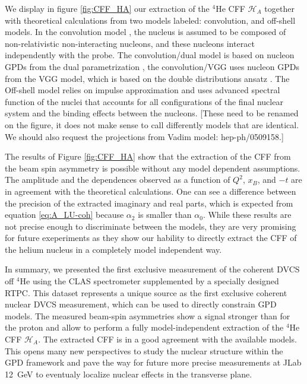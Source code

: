 \documentclass[nofootinbib,twocolumn,showpacs,prl,superscriptaddress,secnumarabic,amssymb,nobibnotes,aps,floatfix,preprint]{revtex4}
\begin{document}
We display in figure \ref{fig:CFF_HA} our extraction of the $^4$He CFF 
$\mathcal{H}_A$ together with theoretical calculations from two models 
labeled: convolution, and off-shell models. In the convolution 
model \cite{Vadim_priv}, the nucleus is assumed to be composed of 
non-relativistic non-interacting nucleons, and these nucleons interact 
independently with the probe. The convolution/dual model is based on nucleon GPDs from 
the dual parametrization \cite{Guzey:2006xi}, the convolution/VGG uses nucleon GPDs  
from the VGG model, which is based on the double distributions ansatz 
\cite{DD_model}. The Off-shell model \cite{GonzalezHernandez:2012jv} relies on 
impulse approximation and uses advanced spectral function of the 
nuclei that accounts for all configurations of the final nuclear system and the 
binding effects between the nucleons.
[These need to be renamed on the figure, it does not make sense to call differently
models that are identical. We should also request the projections from Vadim
model: hep-ph/0509158.]

The results of Figure \ref{fig:CFF_HA} show that the extraction of the CFF
from the beam spin asymmetry is possible without any model dependent 
assumptions. The amplitude and the dependences observed as a function of 
$Q^{2}$, $x_B$, and $-t$ are in agreement 
with the theoretical calculations. One can see a difference between the 
precision of the extracted imaginary and real parts, which is expected from
equation \ref{eq:A_LU-coh} because $\alpha_2$ is smaller than $\alpha_0$. 
While these results are not precise enough to discriminate between the models,
they are very promising for future exeperiments as they show our hability
to directly extract the CFF of the helium nucleus in a completely model
independent way.


In summary, we presented the first exclusive measurement of the coherent DVCS 
off $^4$He using the CLAS spectrometer supplemented  
by a specially designed RTPC. This dataset represents a 
unique source as the first exclusive coherent nuclear DVCS measurement, which 
can be used to directly constrain GPD models. The measured beam-spin asymmetries 
show a signal stronger than for the proton and allow to perform a fully 
model-independent extraction of the $^4$He CFF $\mathcal{H}_A$. The extracted 
CFF is in a good agreement with the available models. This opens 
many new perspectives to study the nuclear structure within the GPD framework 
and pave the way for future more precise measurements at JLab 12~GeV to 
eventualy localize nuclear effects in the transverse plane.
\end{document}

